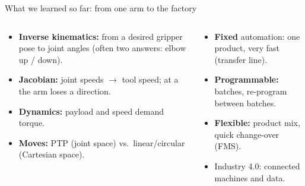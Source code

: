 \documentclass[aspectratio=169,10pt]{beamer}
\begin{document}
\begin{frame}[t]{What we learned so far: from one arm to the factory}
\begin{columns}[T,onlytextwidth]
\begin{defbox}
\begin{itemize}\small
\item \textbf{Inverse kinematics:} from a desired gripper pose to joint angles (often two answers: elbow up / down).
\item \textbf{Jacobian:} joint speeds $\to$ tool speed; at a  the arm loses a direction.
\item \textbf{Dynamics:} payload and speed demand torque.
\item \textbf{Moves:} PTP (joint space) vs.\ linear/circular (Cartesian space).
\end{itemize}
\end{defbox}
\begin{defbox}
\begin{itemize}\small
\item \textbf{Fixed} automation: one product, very fast (transfer line).
\item \textbf{Programmable:} batches, re-program between batches.
\item \textbf{Flexible:} product mix, quick change-over (FMS).
\item Industry 4.0: connected machines and data.
\end{itemize}
\end{defbox}
\centering
{}
\end{columns}
\end{frame}
\end{document}
